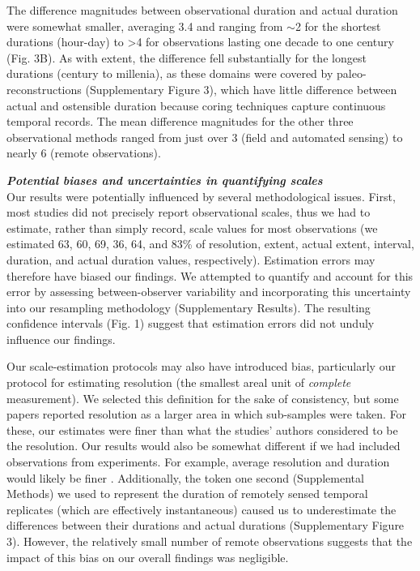 \documentclass[12pt]{article}
\begin{document}
The difference magnitudes between observational duration and actual duration were somewhat smaller, averaging 3.4 and ranging from $\sim$2 for the shortest durations (hour-day) to >4 for observations lasting one decade to one century (Fig. 3B). As with extent, the difference fell substantially for the longest durations (century to millenia), as these domains were covered by paleo-reconstructions (Supplementary Figure 3), which have little difference between actual and ostensible duration because coring techniques capture continuous temporal records. The mean difference magnitudes for the other three observational methods ranged from just over 3 (field and automated sensing) to nearly 6 (remote observations). 

\vspace{5pt}
\noindent \textbf{\emph{Potential biases and uncertainties in quantifying scales}}\\
Our results were potentially influenced by several methodological issues. First, most studies did not precisely report observational scales, thus we had to estimate, rather than simply record, scale values for most observations (we estimated 63, 60, 69, 36, 64, and 83\% of resolution, extent, actual extent, interval, duration, and actual duration values, respectively). Estimation errors may therefore have biased our findings. We attempted to quantify and account for this error by assessing between-observer variability and incorporating this uncertainty into our resampling methodology (Supplementary Results). The resulting confidence intervals (Fig. 1) suggest that estimation errors did not unduly influence our findings. 

Our scale-estimation protocols may also have introduced bias, particularly our protocol for estimating resolution (the smallest areal unit of \emph{complete} measurement). We selected this definition for the sake of consistency, but some papers reported resolution as a larger area in which sub-samples were taken. For these, our estimates were finer than what the studies' authors considered to be the resolution. Our results would also  be somewhat different if we had included observations from experiments. For example, average resolution and duration would likely be finer \cite{tilman_ecological_1989,kareiva_spatial_1988}. Additionally, the token one second (Supplemental Methods) we used to represent the duration of remotely sensed temporal replicates (which are effectively instantaneous) caused us to underestimate the differences between their durations and actual durations (Supplementary Figure 3). However, the relatively small number of remote observations suggests that the impact of this bias on our overall findings was negligible.  
\end{document}
